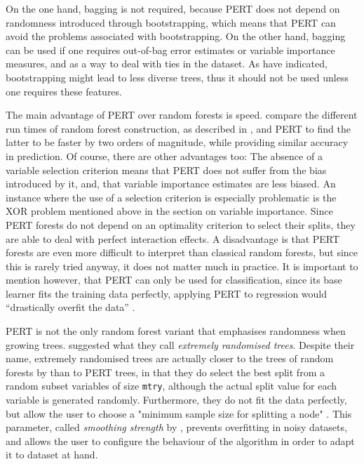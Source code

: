 \documentclass[a4paper,man,12pt,apacite,floatsintext,draftfirst]{apa6} %
\begin{document}
On the one hand, bagging is not required, because PERT does not depend on
randomness introduced through bootstrapping, which means that PERT can
avoid the problems associated with bootstrapping.
On the other hand, bagging can be used if one requires out-of-bag
error estimates or variable importance measures, and as a way to deal
with ties in the dataset.
As  have indicated, bootstrapping might lead
to less diverse trees, thus it should not be used unless one requires
these features.

The main advantage of PERT over random forests is speed.
 compare the different run times of random
forest construction, as described in , and PERT
to find the latter to be faster by two orders of magnitude,
while providing similar accuracy in prediction.
Of course, there are other advantages too:
The absence of a variable selection criterion means that PERT does not suffer
from the bias introduced by it, and, that variable importance estimates are less
biased.
An instance where the use of a selection criterion is especially problematic
is the XOR problem mentioned above in the section on variable importance.
Since PERT forests do not depend on an optimality criterion to select their
splits, they are able to deal with perfect
interaction effects.
A disadvantage is that PERT forests are even more difficult to interpret than
classical random forests, but since this is rarely tried anyway,
it does not matter much in practice.
It is important to mention however, that PERT can only be used for
classification,
since its base learner fits the training data perfectly, applying PERT to
regression would “drastically overfit the data” \cite{cutler2001pert}.

PERT is not the only random forest variant that emphasises randomness
when growing trees.
 suggested what they call \emph{extremely randomised trees}.
Despite their name, extremely randomised trees are actually closer to the
trees of random forests by  than to PERT trees, 
in that they do select the best split from a random subset variables of size \texttt{mtry},
although the actual split value for each variable is generated randomly.
Furthermore, they do not fit the data perfectly, but allow the user to
choose a "minimum sample size for splitting a node" \cite{geurts2006extremely}.
This parameter, called \emph{smoothing strength} by ,
prevents overfitting in noisy datasets, and allows the user to configure the
behaviour of the algorithm in order to adapt
it to dataset at hand.
\end{document}
